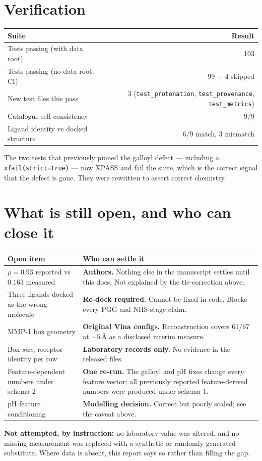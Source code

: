 \documentclass[11pt,a4paper]{article}
\newcommand{\ok}[1]{\textcolor{okgreen}{#1}}
\newcommand{\bad}[1]{\textcolor{badred}{#1}}
\newcommand{\code}[1]{\texttt{\small #1}}
\begin{document}
\section{Verification}

\begin{center}
\begin{tabular}{@{}lr@{}}
\toprule
\textbf{Suite} & \textbf{Result} \\
\midrule
Tests passing (with data root)      & \ok{103} \\
Tests passing (no data root, CI)    & \ok{99 + 4 skipped} \\
New test files this pass            & 3 (\code{test\_protonation}, \code{test\_provenance}, \code{test\_metrics}) \\
Catalogue self-consistency          & \ok{9/9} \\
Ligand identity vs docked structure & \bad{6/9 match, 3 mismatch} \\
\bottomrule
\end{tabular}
\end{center}

The two tests that previously pinned the galloyl defect --- including a
\code{xfail(strict=True)} --- now XPASS and fail the suite, which is the
correct signal that the defect is gone. They were rewritten to assert correct
chemistry.

\section{What is still open, and who can close it}

\begin{longtable}{@{}L{5.6cm}L{9.4cm}@{}}
\toprule
\textbf{Open item} & \textbf{Who can settle it} \\
\midrule
\endhead
$\rho = 0.93$ reported vs $0.163$ measured &
  \textbf{Authors.} Nothing else in the manuscript settles until this does.
  Not explained by the tie-correction above. \\
Three ligands docked as the wrong molecule &
  \textbf{Re-dock required.} Cannot be fixed in code. Blocks every PGG and
  NHS-stage claim. \\
MMP-1 box geometry &
  \textbf{Original Vina configs.} Reconstruction covers 61/67 at
  ${\sim}5$\,\AA{} as a disclosed interim measure. \\
Box \emph{size}, receptor identity per row &
  \textbf{Laboratory records only.} No evidence in the released files. \\
Feature-dependent numbers under schema 2 &
  \textbf{One re-run.} The galloyl and pH fixes change every feature vector;
  all previously reported feature-derived numbers were produced under
  schema 1. \\
pH feature conditioning &
  \textbf{Modelling decision.} Correct but poorly scaled; see the caveat
  above. \\
\bottomrule
\end{longtable}

\vspace{1em}
\noindent
\textbf{Not attempted, by instruction:} no laboratory value was altered, and
no missing measurement was replaced with a synthetic or randomly generated
substitute. Where data is absent, this report says so rather than filling the
gap.
\end{document}
